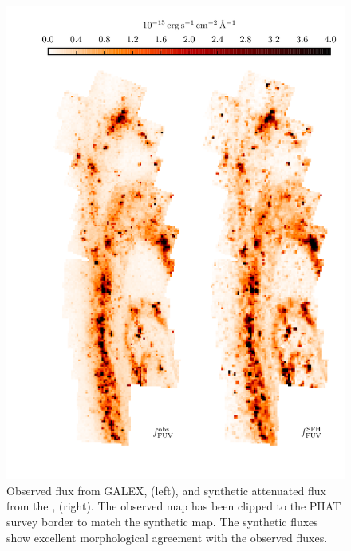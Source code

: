 \documentclass[iop, tighten]{emulateapj}
\begin{document}
\begin{figure}
\centering
\includegraphics[scale=0.9]{m31flux-figures/fluxmaps_fuv.pdf}
\caption[Observed and synthetic attenuated \fuv{} flux maps.]{Observed \fuv{}
    flux from GALEX, \ffuvobs{} (left), and synthetic attenuated \fuv{} flux
    from the , \ffuvsfh{} (right). The observed map has been clipped to
    the PHAT survey border to match the synthetic map. The synthetic fluxes
    show excellent morphological agreement with the observed fluxes.
}
\label{fig:mfx:fluxmaps_fuv}
\end{figure}
\end{document}
